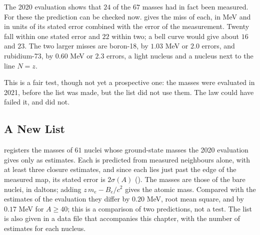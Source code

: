 The 2020 evaluation shows that $24$ of the $67$ masses had in fact been measured. For these the prediction can be checked now.  gives the miss of each, in MeV and in units of its stated error combined with the error of the measurement. Twenty fall within one stated error and $22$ within two; a bell curve would give about $16$ and $23$. The two larger misses are boron-18, by $1.03$ MeV or $2.0$ errors, and rubidium-73, by $0.60$ MeV or $2.3$ errors, a light nucleus and a nucleus next to the line $N = z$.

\begin{table}[tb]
\myfloatalign
\footnotesize

\caption[The first test]{The $24$ nuclei of the first registered list whose masses turn out to be measured in the 2020 evaluation: the miss, predicted minus measured, in MeV and in units of the stated error combined with that of the measurement.}
\label{tab:cl-first}
\end{table}

This is a fair test, though not yet a prospective one: the masses were evaluated in 2021, before the list was made, but the list did not use them. The law could have failed it, and did not.

\subsection{A New List}\label{subsec:cl-newlist}

 registers the masses of $61$ nuclei whose ground-state masses the 2020 evaluation gives only as estimates. Each is predicted from measured neighbours alone, with at least three closure estimates, and since each lies just past the edge of the measured map, its stated error is $2\sigma(A)$ (). The masses are those of the bare nuclei, in daltons; adding $z\,m_e - B_e/c^2$ gives the atomic mass. Compared with the estimates of the evaluation they differ by $0.20$ MeV, root mean square, and by $0.17$ MeV for $A \ge 40$; this is a comparison of two predictions, not a test. The list is also given in a data file that accompanies this chapter, with the number of estimates for each nucleus.

\begin{table}[tbp]
\myfloatalign
\footnotesize

\caption[Registered predictions]{Registered predictions of the Closure Law, 2 November 2026: the mass of the bare nucleus, in daltons, of $61$ nuclei whose masses were not measured in the 2020 evaluation, each predicted from measured neighbours only, with its stated error $2\sigma(A)$ in MeV.}
\label{tab:cl-registered}
\end{table}

